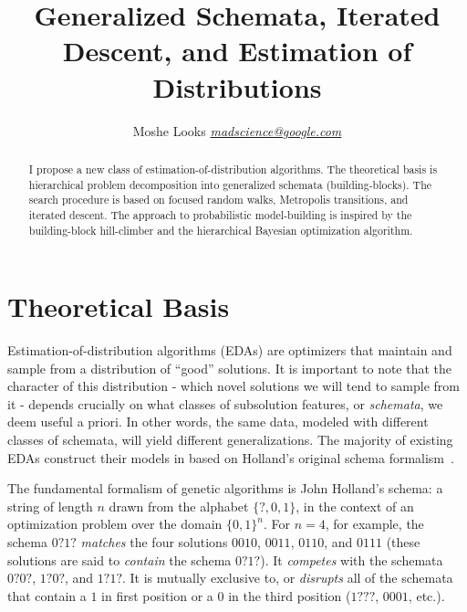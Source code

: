 \documentclass[letterpaper]{article}
\begin{document}
\sloppy
\title
{Generalized Schemata, Iterated Descent, and Estimation of Distributions}
\author{
  Moshe Looks
  \href{mailto:moshe@metacog.org}{\emph{madscience@google.com}}
}
\maketitle

\begin{abstract}
  I propose a new class of estimation-of-distribution algorithms. The
  theoretical basis is hierarchical problem decomposition into generalized
  schemata (building-blocks). The search procedure is based on focused random
  walks, Metropolis transitions, and iterated descent. The approach to
  probabilistic model-building is inspired by the building-block hill-climber
  and the hierarchical Bayesian optimization algorithm.
\end{abstract}

\section{Theoretical Basis}

Estimation-of-distribution algorithms (EDAs) are optimizers that maintain and
sample from a distribution of ``good'' solutions. It is important to note that
the character of this distribution - which novel solutions we will tend to
sample from it - depends crucially on what classes of subsolution features, or
\emph{schemata}, we deem useful a priori. In other words, the same data,
modeled with different classes of schemata, will yield different
generalizations. The majority of existing EDAs construct their models in based
on Holland's original schema formalism~\cite{Holland,Goldberg}.

The fundamental formalism of genetic algorithms is John Holland's schema: a
string of length $n$ drawn from the alphabet $\{?,0,1\}$, in the context of an
optimization problem over the domain $\{0,1\}^n$. For $n=4$, for example, the
schema $0?1?$ \emph{matches} the four solutions $0010$, $0011$, $0110$, and
$0111$ (these solutions are said to \emph{contain} the schema $0?1?$). It
\emph{competes} with the schemata $0?0?$, $1?0?$, and $1?1?$. It is mutually
exclusive to, or \emph{disrupts} all of the schemata that contain a $1$ in
first position or a $0$ in the third position ($1???$, $0001$, etc.).
\end{document}
